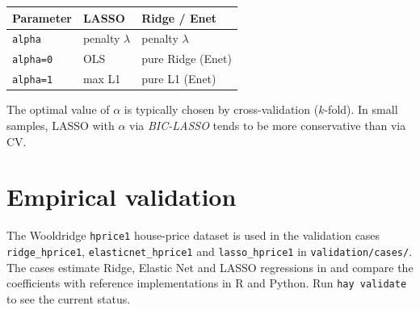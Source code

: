 \begin{center}
\begin{tabular}{lll}
\toprule
\textbf{Parameter} & \textbf{LASSO} & \textbf{Ridge / Enet} \\
\midrule
\texttt{alpha} & penalty $\lambda$ & penalty $\lambda$ \\
\texttt{alpha=0} & OLS & pure Ridge (Enet) \\
\texttt{alpha=1} & max L1 & pure L1 (Enet) \\
\bottomrule
\end{tabular}
\end{center}

\begin{nota}
  The optimal value of $\alpha$ is typically chosen by cross-validation
  ($k$-fold). In small samples, LASSO with $\alpha$ via \emph{BIC-LASSO}
  tends to be more conservative than via CV.
\end{nota}

\section{Empirical validation}

The Wooldridge \texttt{hprice1} house-price dataset is used in the
validation cases \texttt{ridge_hprice1}, \texttt{elasticnet_hprice1} and
\texttt{lasso_hprice1} in \texttt{validation/cases/}. The cases estimate Ridge,
Elastic Net and LASSO regressions in \hayashi{} and compare the coefficients
with reference implementations in R and Python. Run \lstinline{hay validate} to
see the current status.

